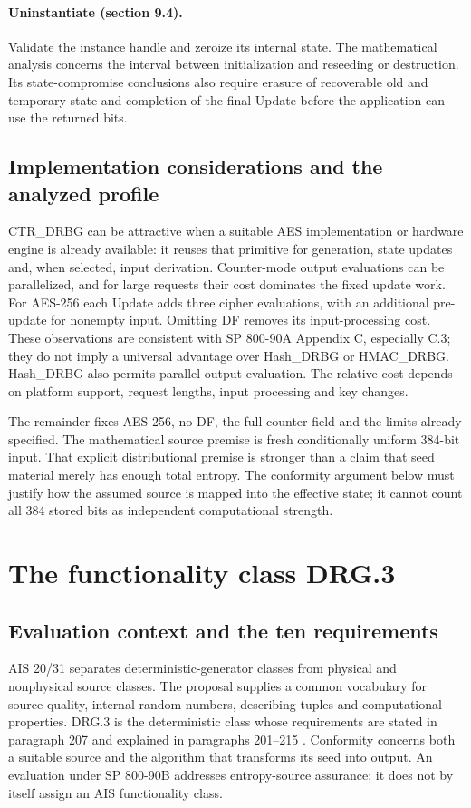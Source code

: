 \documentclass[journal=tosc,preprint,floatrow,nohyperxmp]{iacrtrans}
\numberwithin{lemma}{section}
\numberwithin{proposition}{section}
\numberwithin{equation}{section}
\theoremstyle{definition}
\numberwithin{definition}{section}
\theoremstyle{plain}
\begin{document}
\paragraph{Uninstantiate (section 9.4).}
Validate the instance handle and zeroize its internal state. The mathematical analysis concerns the interval between initialization and reseeding or destruction. Its state-compromise conclusions also require erasure of recoverable old and temporary state and completion of the final Update before the application can use the returned bits.

\subsection{Implementation considerations and the analyzed profile}
CTR\_DRBG can be attractive when a suitable AES implementation or hardware engine is already available: it reuses that primitive for generation, state updates and, when selected, input derivation. Counter-mode output evaluations can be parallelized, and for large requests their cost dominates the fixed update work. For AES-256 each Update adds three cipher evaluations, with an additional pre-update for nonempty input. Omitting DF removes its input-processing cost. These observations are consistent with SP 800-90A Appendix C, especially C.3; they do not imply a universal advantage over Hash\_DRBG or HMAC\_DRBG. Hash\_DRBG also permits parallel output evaluation. The relative cost depends on platform support, request lengths, input processing and key changes.

The remainder fixes AES-256, no DF, the full counter field and the limits already specified. The mathematical source premise is fresh conditionally uniform 384-bit input. That explicit distributional premise is stronger than a claim that seed material merely has enough total entropy. The conformity argument below must justify how the assumed source is mapped into the effective state; it cannot count all 384 stored bits as independent computational strength.

\section{The functionality class DRG.3}\label{sec:properties}
\subsection{Evaluation context and the ten requirements}
AIS 20/31 separates deterministic-generator classes from physical and nonphysical source classes. The proposal supplies a common vocabulary for source quality, internal random numbers, describing tuples and computational properties. DRG.3 is the deterministic class whose requirements are stated in paragraph 207 and explained in paragraphs 201--215 \cite{ais}. Conformity concerns both a suitable source and the algorithm that transforms its seed into output. An evaluation under SP 800-90B \cite{90b} addresses entropy-source assurance; it does not by itself assign an AIS functionality class.
\end{document}
